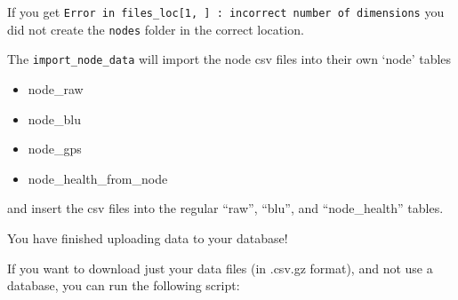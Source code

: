 \documentclass[
]{book}
\providecommand{\tightlist}{%
  \setlength{\itemsep}{0pt}\setlength{\parskip}{0pt}}
\begin{document}
If you get \texttt{Error\ in\ files\_loc{[}1,\ {]}\ :\ incorrect\ number\ of\ dimensions} you did not create the \texttt{nodes} folder in the correct location.

The \texttt{import\_node\_data} will import the node csv files into their own `node' tables

\begin{itemize}
\tightlist
\item
  node\_raw
\item
  node\_blu
\item
  node\_gps
\item
  node\_health\_from\_node
\end{itemize}

and insert the csv files into the regular ``raw'', ``blu'', and ``node\_health'' tables.

You have finished uploading data to your database!

If you want to download just your data files (in .csv.gz format), and not use a database, you can run the following script:
\end{document}

